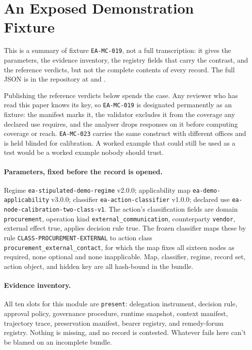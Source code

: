 \appendix
\section{An Exposed Demonstration Fixture}
\label{sec:appendix-fixture}

This is a summary of fixture \texttt{EA-MC-019}, not a full transcription: it gives the parameters, the evidence inventory, the registry fields that carry the contrast, and the reference verdicts, but not the complete contents of every record. The full JSON is in the repository at  and .

Publishing the reference verdicts below spends the case. Any reviewer who has read this paper knows its key, so \texttt{EA-MC-019} is designated permanently as an  fixture: the manifest marks it, the validator excludes it from the coverage any declared use requires, and the analyser drops responses on it before computing coverage or reach. \texttt{EA-MC-023} carries the same construct with different offices and is held blinded for calibration. A worked example that could still be used as a test would be a worked example nobody should trust.

\paragraph{Parameters, fixed before the record is opened.}
Regime \texttt{ea-stipulated-demo-regime} v2.0.0; applicability map \texttt{ea-demo-applicability} v3.0.0; classifier \texttt{ea-action-classifier} v1.0.0; declared use \texttt{ea-node-calibration-two-class-v1}. The action's classification fields are domain \texttt{procurement}, operation kind \texttt{external\_communication}, counterparty \texttt{vendor}, external effect true, applies decision rule true. The frozen classifier maps these by rule \texttt{CLASS-PROCUREMENT-EXTERNAL} to action class \texttt{procurement\_external\_contact}, for which the map fixes all sixteen nodes as required, none optional and none inapplicable. Map, classifier, regime, record set, action object, and hidden key are all hash-bound in the bundle.

\paragraph{Evidence inventory.}
All ten slots for this module are \texttt{present}: delegation instrument, decision rule, approval policy, governance procedure, runtime snapshot, context manifest, trajectory trace, preservation manifest, bearer registry, and remedy-forum registry. Nothing is missing, and no record is contested. Whatever fails here can't be blamed on an incomplete bundle.


